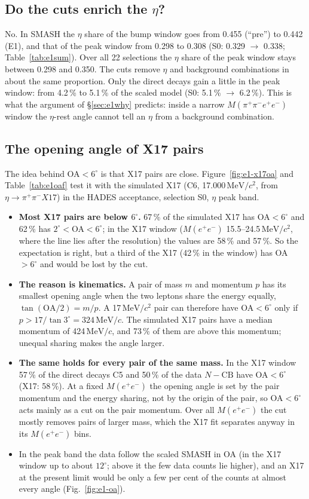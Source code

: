 \documentclass[11pt,a4paper]{article}
\newcommand{\pipi}{\ensuremath{\pi^{+}\pi^{-}}\xspace}
\newcommand{\Mfour}{\ensuremath{M(\pi^{+}\pi^{-}e^{+}e^{-})}\xspace}
\newcommand{\Mee}{\ensuremath{M(e^{+}e^{-})}\xspace}
\newcommand{\MeVc}{\ensuremath{\mathrm{MeV}/c}\xspace}
\newcommand{\MeVcc}{\ensuremath{\mathrm{MeV}/c^{2}}\xspace}
\newcommand{\cs}[1]{\textsf{#1}}%
\begin{document}
\subsection{Do the cuts enrich the \texorpdfstring{$\eta$}{eta}?}
\label{sec:e1eta}
No. In SMASH the $\eta$ share of the bump window goes from 0.455 (``pre'') to 0.442 (\cs{E1}), and that of the peak window from 0.298 to 0.308
(S0: 0.329 $\to$ 0.338; Table~\ref{tab:e1sum}). Over all 22 selections the $\eta$ share of the peak window stays between 0.298 and 0.350. The cuts
remove $\eta$ and background combinations in about the same proportion. Only the direct decays gain a little in the peak window: from 4.2\,\% to 5.1\,\%
of the scaled model (S0: 5.1\,\% $\to$ 6.2\,\%). This is what the argument of \S\ref{sec:e1why} predicts: inside a narrow \Mfour window the
$\eta$-rest angle cannot tell an $\eta$ from a background combination.

\subsection{The opening angle of X17 pairs}
\label{sec:e1oa}
The idea behind OA$<6^\circ$ is that X17 pairs are close. Figure~\ref{fig:e1-x17oa} and Table~\ref{tab:e1oaf} test it with the simulated X17
(C6, 17.000\,\MeVcc, from $\eta\to\pipi X17$) in the HADES acceptance, selection S0, $\eta$ peak band.
\begin{itemize}\setlength{\itemsep}{1pt}
\item \textbf{Most X17 pairs are below $6^\circ$.} 67\,\% of the simulated X17 has OA$<6^\circ$ and 62\,\% has $2^\circ<$OA$<6^\circ$; in the X17
      window (\Mee 15.5--24.5\,\MeVcc, where the line lies after the resolution) the values are 58\,\% and 57\,\%. So the expectation is right,
      but a third of the X17 (42\,\% in the window) has OA$>6^\circ$ and would be lost by the cut.
\item \textbf{The reason is kinematics.} A pair of mass $m$ and momentum $p$ has its smallest opening angle when the two leptons share the energy
      equally, $\tan(\mathrm{OA}/2)=m/p$. A 17\,\MeVcc pair can therefore have OA$<6^\circ$ only if $p>17/\tan3^\circ=324$\,\MeVc. The
      simulated X17 pairs have a median momentum of 424\,\MeVc, and 73\,\% of them are above this momentum; unequal sharing makes the angle
      larger.
\item \textbf{The same holds for every pair of the same mass.} In the X17 window 57\,\% of the direct decays C5 and 50\,\% of the data
      $N-\mathrm{CB}$ have OA$<6^\circ$ (X17: 58\,\%). At a fixed \Mee the opening angle is set by the pair momentum and the energy sharing, not
      by the origin of the pair, so OA$<6^\circ$ acts mainly as a cut on the pair momentum. Over all \Mee the cut mostly removes pairs of larger
      mass, which the X17 fit separates anyway in its \Mee bins.
\item In the peak band the data follow the scaled SMASH in OA (in the X17 window up to about $12^\circ$; above it the few data counts lie
      higher), and an X17 at the present limit would be only a few per cent of the counts at almost every angle (Fig.~\ref{fig:e1-oa}).
\end{itemize}
\end{document}
